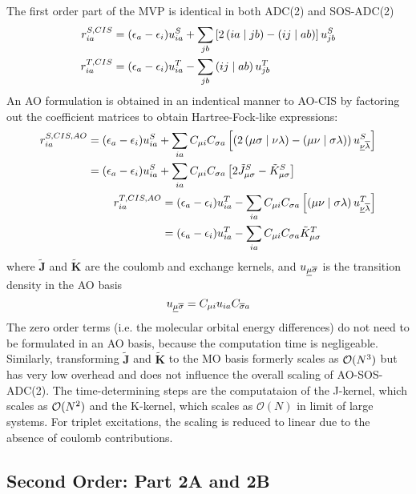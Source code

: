 The first order part of the MVP is identical in both ADC(2) and SOS-ADC(2)
\begin{align}
r_{ia}^{S,CIS} &= (\epsilon_a - \epsilon_i) u^S_{ia} + \sum_{jb} \left[ 2\left( ia \mid jb \right) - \left( ij \mid ab \right)\right] u^S_{jb} \\
r_{ia}^{T,CIS} &= (\epsilon_a - \epsilon_i) u^T_{ia} - \sum_{jb} \left( ij \mid ab \right) u^T_{jb} 
\end{align}
\noindent An AO formulation is obtained in an indentical manner to AO-CIS by factoring out the coefficient matrices to obtain Hartree-Fock-like expressions:
\begin{align}
\begin{split}
r_{ia}^{S,CIS,AO} &= (\epsilon_a - \epsilon_i) u^S_{ia} + \sum_{ia} C_{\mu i} C_{\sigma a} \left[ \left( 2\left( \mu\sigma \mid \nu\lambda \right) - \left( \mu\nu \mid \sigma\lambda \right) \right) u^S_{\underline{\nu} \overline{\lambda}} \right] \\
&= (\epsilon_a - \epsilon_i) u^S_{ia} + \sum_{ia} C_{\mu i} C_{\sigma a} \left[ 2\tilde{J}^S_{\mu\sigma} - \tilde{K}^S_{\mu\sigma} \right]
\end{split}
\\
\begin{split}
r_{ia}^{T,CIS,AO} &= (\epsilon_a - \epsilon_i) u^T_{ia} - \sum_{ia} C_{\mu i} C_{\sigma a} \left[ \left( \mu\nu \mid \sigma\lambda \right) u^T_{\underline{\nu} \overline{\lambda}} \right] \\
&= (\epsilon_a - \epsilon_i) u^T_{ia} - \sum_{ia} C_{\mu i} C_{\sigma a} \tilde{K}^T_{\mu\sigma} 
\end{split}
\end{align}
\noindent where $\mathbf{\tilde{J}}$ and $\mathbf{\tilde{K}}$ are the coulomb and exchange kernels, and $u_{\underline{\mu}\overline{\sigma}}$ is the transition density in the AO basis
\begin{equation}
u_{\underline{\mu}\overline{\sigma}} = C_{\mu i} u_{ia} C_{\overline{\sigma} a}
\end{equation}
\noindent The zero order terms (i.e. the molecular orbital energy differences) do not need to be formulated in an AO basis, because the computation time is negligeable. Similarly, transforming $\mathbf{\tilde{J}}$ and $\mathbf{\tilde{K}}$ to the MO basis formerly scales as $\mathcal{O}(N^{3})$ but has very low overhead and does not influence the overall scaling of AO-SOS-ADC(2). The time-determining steps are the computataion of the J-kernel, which scales as $\mathcal{O}(N^{2})$ and the K-kernel, which scales as $\mathcal{O}(N)$ in limit of large systems. For triplet excitations, the scaling is reduced to linear due to the absence of coulomb contributions.

\subsection{Second Order: Part 2A and 2B}

